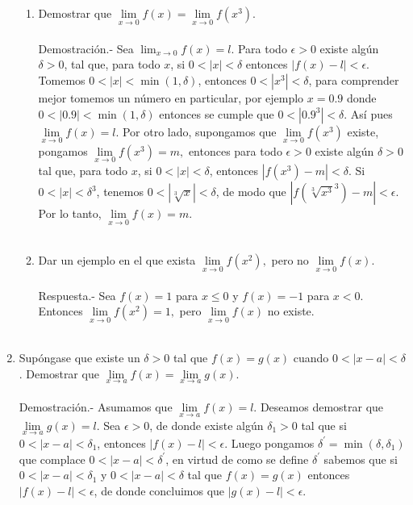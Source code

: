 \begin{enumerate}
\begin{enumerate}[\bfseries (a)]
    \item Demostrar que $\lim\limits_{x\to 0} f(x) = \lim\limits_{x\to 0} f(x^3)$.\\\\
	Demostración.-\; Sea $\lim_{x\to 0} f(x) = l.$ Para todo $\epsilon > 0$ existe algún $\delta > 0$, tal que, para todo $x$, si $0<|x|<\delta$ entonces $|f(x)-l|<\epsilon$. Tomemos $0<|x|<\min(1,\delta)$, entonces $0<|x^3|<\delta$, para comprender mejor tomemos un número en particular, por ejemplo $x = 0.9$ donde $0<|0.9|<\min(1,\delta)$ entonces se cumple que $0<|0.9^{3}|<\delta$. Así pues $\lim\limits_{x\to 0} f(x) = l$. Por otro lado, supongamos que $\lim\limits_{x\to 0} f(x^3)$ existe, pongamos $\lim\limits_{x\to 0} f(x^3) = m,$ entonces para todo $\epsilon>0$ existe algún $\delta > 0$ tal que, para todo $x$, si $0<|x|<\delta$, entonces $|f(x^3)-m|<\delta$. Si $0<|x|<\delta^3$, tenemos $0<|\sqrt[3]{x}|<\delta$, de modo que $|f(\sqrt[3]{x^3}^3)-m|<\epsilon$. Por lo tanto, $\lim\limits_{x\to 0} f(x) = m$.\\\\

    \item Dar un ejemplo en el que exista $\lim\limits_{x\to 0} f(x^2),$ pero no $\lim\limits_{x\to 0} f(x)$.\\\\
	Respuesta.-\; Sea $f(x)=1$ para $x\leq 0$ y $f(x) = -1$ para $x<0$. Entonces $\lim\limits_{x\to 0} f(x^2) = 1,$ pero $\lim\limits_{x \to 0} f(x)$ no existe. \\\\

\end{enumerate}

\item Supóngase que existe un $\delta > 0$ tal que $f(x) = g(x)$ cuando $0<|x-a|<\delta$. Demostrar que $\lim\limits_{x \to a} f(x) = \lim\limits_{x \to a} g(x)$.\\\\
    Demostración.-\; Asumamos que  $\lim\limits_{x \to a} f(x) = l$. Deseamos demostrar que $\lim\limits_{x \to a} g(x) = l$. Sea $\epsilon > 0$, de donde existe algún $\delta_1 > 0$ tal que si $0<|x-a|<\delta_1$, entonces $|f(x)-l|<\epsilon$. Luego pongamos $\delta^{'} = \min(\delta,\delta_1)$ que complace  $0<|x-a|<\delta^{'}$, en virtud de como se define $\delta^{'}$ sabemos que si $0<|x-a|<\delta_1$ y $0<|x-a|<\delta$ tal que $f(x)=g(x)$ entonces $|f(x)-l|<\epsilon$, de donde concluimos que $|g(x) - l|<\epsilon$.\\\\


\end{enumerate}
